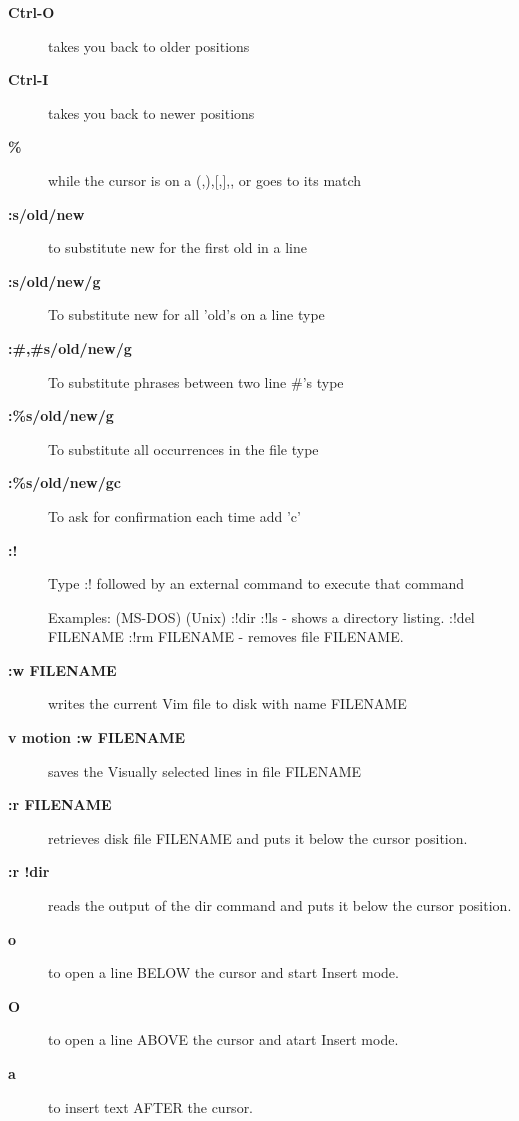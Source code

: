 \documentclass[10pt,a4paper]{scrartcl}
\begin{document}
\begin{description}
\item[\bf{Ctrl-O}] takes you back to older positions

\item[\bf{Ctrl-I}] takes you back to newer positions

\item[\bf{\%}] while the cursor is on a (,),[,],{, or } goes to its match

\item[\bf{:s/old/new}] to substitute new for the first old in a line

\item[\bf{:s/old/new/g}] To substitute new for all 'old's on a line type 

\item[\bf{:\#,\#s/old/new/g}] To substitute phrases between two line \#'s type

\item[\bf{:\%s/old/new/g}] To substitute all occurrences in the file type

\item[\bf{:\%s/old/new/gc}] To ask for confirmation each time add 'c'

\item[\bf{:!}] Type  :!  followed by an external command to execute that command

Examples: (MS-DOS)         (Unix)
          :!dir            :!ls            -  shows a directory listing.
          :!del FILENAME   :!rm FILENAME   -  removes file FILENAME.

\item[\bf{:w FILENAME}] writes the current Vim file to disk with name FILENAME

\item[\bf{v  motion  :w FILENAME}]  saves the Visually selected lines in file FILENAME

\item[\bf{:r FILENAME}] retrieves disk file FILENAME and puts it below the
      cursor position.

\item[\bf{:r !dir}] reads the output of the dir command and puts it below the
      cursor position.

\item[\bf{o}] to open a line BELOW the cursor and start Insert mode.

\item[\bf{O}] to open a line ABOVE the cursor and atart Insert mode.

\item[\bf{a}] to insert text AFTER the cursor.


\end{description}
\end{document}
